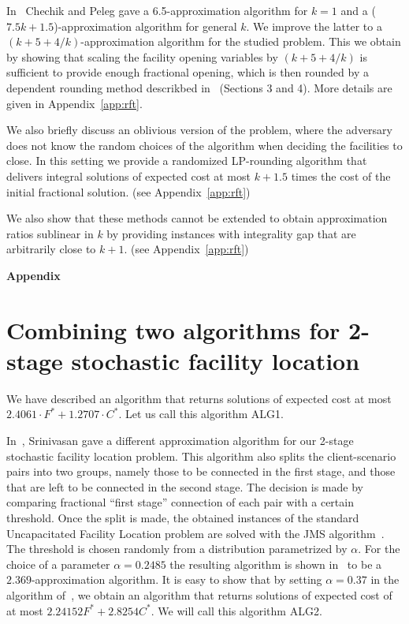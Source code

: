 \documentclass[11pt]{article}
\begin{document}
In~\cite{DBLP:conf/stacs/ChechikP10} Chechik and Peleg gave a 6.5-approximation algorithm for $k=1$ and a ($7.5k + 1.5$)-approximation algorithm
for general $k$. We improve the latter to a $(k+5+4/k)$-approximation algorithm for the studied problem.
This we obtain by showing that scaling the facility opening variables by $(k+5+4/k)$ is sufficient
to provide enough fractional opening, which is then rounded by a dependent rounding method 
descrikbed in~\cite{ipco10} (Sections 3 and 4). More details are given in Appendix~\ref{app:rft}.

We also briefly discuss an oblivious version of the problem, where the adversary does not know
the random choices of the algorithm when deciding the facilities to close. In this setting 
we provide a randomized LP-rounding algorithm that delivers integral solutions
of expected cost at most $k + 1.5$ times the cost of the initial fractional solution. (see Appendix~\ref{app:rft})

We also show that these methods cannot be extended to obtain approximation ratios sublinear 
in $k$ by providing instances with integrality gap that are arbitrarily
close to $k + 1$. (see Appendix~\ref{app:rft})




\appendix
\begin{center}
\Large{\textbf{Appendix}}
\end{center}

\section{Combining two algorithms for 2-stage stochastic facility location}
\label{app:comb-alg}

We have described an algorithm that returns solutions of expected cost at most $2.4061 \cdot F^* + 1.2707 \cdot C^*$.
Let us call this algorithm ALG1.

In~\cite{DBLP:conf/soda/Srinivasan07}, Srinivasan gave a different approximation algorithm for our 2-stage stochastic facility location problem.
This algorithm also splits the client-scenario pairs into two groups, namely those to be connected in the first stage,
and those that are left to be connected in the second stage. The decision is made by comparing fractional ``first stage'' connection 
of each pair with a certain threshold. Once the split is made, the obtained instances of the standard Uncapacitated Facility Location problem are
solved with the JMS algorithm~\cite{DBLP:journals/jacm/JainMMSV03}. 
The threshold is chosen randomly from a distribution parametrized 
by $\alpha$. For the choice of a parameter $\alpha = 0.2485$ the resulting algorithm is shown in~\cite{DBLP:conf/soda/Srinivasan07} to be a $2.369$-approximation algorithm.
It is easy to show that by setting $\alpha = 0.37$ in the algorithm of~\cite{DBLP:conf/soda/Srinivasan07}, we obtain
an algorithm that returns solutions of expected cost of at most $2.24152 F^* + 2.8254 C^*$.
We will call this algorithm ALG2.
\end{document}
